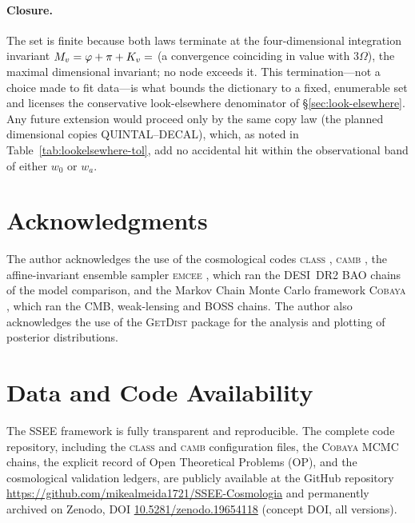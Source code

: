 \documentclass[aps,prd,preprint,amsmath,amssymb,nofootinbib,longbibliography]{revtex4-2}
\begin{document}
\paragraph{Closure.} The set is finite because both laws terminate at the
four-dimensional integration invariant $M_v=\varphi+\pi+K_v=\val{M_V_d6}$ (a convergence coinciding in value with $3\Omega$), the maximal dimensional
invariant; no node exceeds it. This termination---not a
choice made to fit data---is what bounds the dictionary to a fixed, enumerable
set and licenses the conservative look-elsewhere denominator of
\S\ref{sec:look-elsewhere}. Any future extension would proceed only by the same
copy law (the planned dimensional copies QUINTAL--DECAL), which, as noted in
Table~\ref{tab:lookelsewhere-tol}, add no accidental hit within the
observational band of either $w_0$ or $w_a$.

\section*{Acknowledgments}
The author acknowledges the use of the cosmological codes \textsc{class} \citep{Blas2011}, \textsc{camb} \citep{Lewis2000}, the affine-invariant ensemble sampler \textsc{emcee} \citep{emcee}, which ran the DESI~DR2 BAO chains of the model comparison, and the Markov Chain Monte Carlo framework \textsc{Cobaya} \citep{Torrado2021}, which ran the CMB, weak-lensing and BOSS chains. The author also acknowledges the use of the \textsc{GetDist} package \citep{Lewis2019} for the analysis and plotting of posterior distributions.

\section*{Data and Code Availability}
The SSEE framework is fully transparent and reproducible. The complete code repository, including the \textsc{class} and \textsc{camb} configuration files, the \textsc{Cobaya} MCMC chains, the explicit record of Open Theoretical Problems (OP), and the cosmological validation ledgers, are publicly available at the GitHub repository \url{https://github.com/mikealmeida1721/SSEE-Cosmologia} and permanently archived on Zenodo, DOI \href{https://doi.org/10.5281/zenodo.19654118}{10.5281/zenodo.19654118} (concept DOI, all versions).

\clearpage


\end{document}
